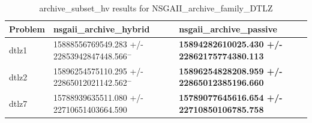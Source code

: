 \begin{table}
\caption{archive_subset_hv results for NSGAII_archive_family_DTLZ}
\label{NSGAII_archive_family_DTLZ_archive_subset_hv}
\begin{tabular}{lll}
\toprule
Problem & nsgaii_archive_hybrid & nsgaii_archive_passive \\
\midrule
dtlz1 & 15888556769549.283 +/- 22853942847448.566$^{-}$ & \textbf{15894282610025.430 +/- 22862175774380.113} \\
dtlz2 & 15896254575110.295 +/- 22865012021142.562$^{-}$ & \textbf{15896254828208.959 +/- 22865012385196.660} \\
dtlz7 & 15788939635511.080 +/- 22710651403664.590 & \textbf{15789077645616.654 +/- 22710850106785.758} \\
\bottomrule
\end{tabular}
\end{table}
